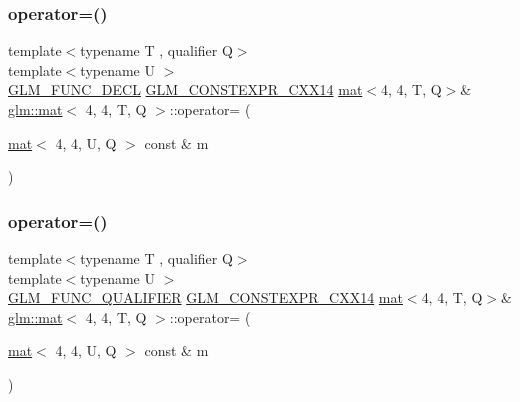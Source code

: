 \subsubsection{\texorpdfstring{operator=()}{operator=()}\hspace{0.1cm}{\footnotesize\ttfamily [2/3]}}
{\footnotesize\ttfamily template$<$typename T , qualifier Q$>$ \\
template$<$typename U $>$ \\
\mbox{\hyperlink{setup_8hpp_ab2d052de21a70539923e9bcbf6e83a51}{G\+L\+M\+\_\+\+F\+U\+N\+C\+\_\+\+D\+E\+CL}} \mbox{\hyperlink{setup_8hpp_a4dd12abf5e1164bc57f3a34671d03844}{G\+L\+M\+\_\+\+C\+O\+N\+S\+T\+E\+X\+P\+R\+\_\+\+C\+X\+X14}} \mbox{\hyperlink{structglm_1_1mat}{mat}}$<$4, 4, T, Q$>$\& \mbox{\hyperlink{structglm_1_1mat}{glm\+::mat}}$<$ 4, 4, T, Q $>$\+::operator= (\begin{DoxyParamCaption}\item[{\mbox{\hyperlink{structglm_1_1mat}{mat}}$<$ 4, 4, U, Q $>$ const \&}]{m }\end{DoxyParamCaption})}

\mbox{\label{structglm_1_1mat_3_014_00_014_00_01_t_00_01_q_01_4_a835f3a0f213fcc160f198bf98c9b5bf0}} 
\subsubsection{\texorpdfstring{operator=()}{operator=()}\hspace{0.1cm}{\footnotesize\ttfamily [3/3]}}
{\footnotesize\ttfamily template$<$typename T , qualifier Q$>$ \\
template$<$typename U $>$ \\
\mbox{\hyperlink{setup_8hpp_a33fdea6f91c5f834105f7415e2a64407}{G\+L\+M\+\_\+\+F\+U\+N\+C\+\_\+\+Q\+U\+A\+L\+I\+F\+I\+ER}} \mbox{\hyperlink{setup_8hpp_a4dd12abf5e1164bc57f3a34671d03844}{G\+L\+M\+\_\+\+C\+O\+N\+S\+T\+E\+X\+P\+R\+\_\+\+C\+X\+X14}} \mbox{\hyperlink{structglm_1_1mat}{mat}}$<$4, 4, T, Q$>$\& \mbox{\hyperlink{structglm_1_1mat}{glm\+::mat}}$<$ 4, 4, T, Q $>$\+::operator= (\begin{DoxyParamCaption}\item[{\mbox{\hyperlink{structglm_1_1mat}{mat}}$<$ 4, 4, U, Q $>$ const \&}]{m }\end{DoxyParamCaption})}



